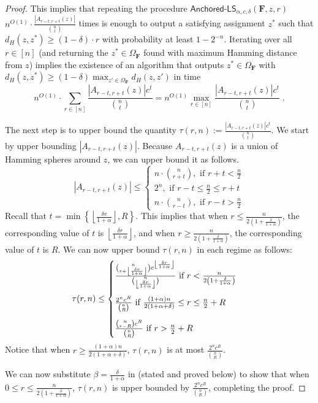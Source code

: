 \documentclass[11pt, letterpaper]{article}
\theoremstyle{definition}
\newcommand{\f}{\mathbf{F}}
\newcommand{\Om}{\Omega_{\f}}
\newcommand{\LS}{\textsf{LS}}
\newcommand{\ALS}{\textsf{Anchored-}\LS}
\newcommand{\floor}[1]{{\left\lfloor{#1}\right\rfloor}}
\begin{document}
\begin{proof}
This implies that repeating the procedure $\ALS_{\alpha, c ,\delta}(\f,z,r)$ $n^{O(1)} \cdot  \frac{|A_{r-t , r+t}(z)|}{\binom{n}{t} }$ times is enough to output a satisfying assignment $z^*$ such that $d_H(z, z^*) \geq \left(1-\delta \right) \cdot  r$ with probability at least $1-2^{-n}$. Iterating over all $r \in [n]$ (and returning the $z^* \in \Om$ found with maximum Hamming distance from $z$) implies the existence of an algorithm that outputs $z^* \in \Om$ with $d_H(z,z^*) \geq (1-\delta) \max_{z' \in \Om} d_H(z,z')$ in time $$n^{O(1)} \cdot \sum_{r \in [n]} \frac{|A_{r-t , r+t}(z)| c^t}{\binom{n}{t}  } = n^{O(1)} \max_{r \in [n]} \frac{|A_{r-t , r+t}(z)| c^t}{\binom{n}{t}  } \; .$$

\medskip \noindent
     The next step is to upper bound the quantity $\tau(r,n):=\frac{|A_{r-t , r+t}(z)| c^t}{\binom{n}{t}}$. We start by upper bounding $|A_{r-t , r+t}(z)|$. Because $A_{r-t , r+t}(z)$ is a union of Hamming spheres around $z$, we can upper bound it as follows. 
     \begin{equation*}
         |A_{r-t , r+t}(z)| \leq \begin{cases}
             n \cdot \binom{n}{r+t}, \text{ if } r+t < \frac{n}{2} \\
             2^n, \text{ if } r-t \leq \frac{n}{2} \leq r+t \\
             n \cdot \binom{n}{r-t}, \text{ if } r-t > \frac{n}{2}
         \end{cases}
     \end{equation*}
    Recall that $t=\min\left\{ \floor{\frac{\delta r}{1+\alpha}}, R\right\}$. This implies that when $r \leq \frac{n}{2\left(1+\frac{\delta}{1+\alpha}\right)}$, the corresponding value of $t$ is $\floor{\frac{\delta r}{1+\alpha}}$, and when $r \geq \frac{n}{2\left(1+\frac{\delta}{1+\alpha}\right)}$, the corresponding value of $t$ is $R$. We can now upper bound $\tau(r,n)$ in each regime as follows:
     \begin{equation*}
         \tau(r,n) \leq \begin{cases}
             \frac{\binom{n}{r+\floor{\frac{\delta r}{1+\alpha}}}c^{\floor{\frac{\delta r}{1+\alpha}}}}{\binom{n}{\floor{\frac{\delta r}{1+\alpha}}} }  \text{ if } r < \frac{n}{2\left(1+\frac{\delta}{1+\alpha}\right)} \\
             \noalign{\vskip9pt}
             \frac{2^n c^{R}}{\binom{n}{R} } \text{ if }\frac{(1+\alpha)n}{2(1+\alpha +\delta)} \leq  r \leq \frac{n}{2}+R\\
             \noalign{\vskip9pt}
             \frac{\binom{n}{r-R}c^{R}}{\binom{n}{R} } \text{ if } r > \frac{n}{2}+R
         \end{cases}
     \end{equation*}
     Notice that when $r \geq \frac{(1+\alpha)n}{2(1+\alpha +\delta)}$, $\tau(r,n)$ is at most $\frac{2^n c^{R}}{\binom{n}{R} }$.

    \medskip \noindent
     We can now substitute $\beta=\frac{\delta}{1+\alpha}$ in  (stated and proved below) to show that when $0 \leq r \leq \frac{n}{2\left(1+\frac{\delta}{1+\alpha}\right)}$, $\tau(r,n)$ is upper bounded by $\frac{2^n c^{R}}{\binom{n}{R} }$, completing the proof.
\end{proof} 
\end{document}
